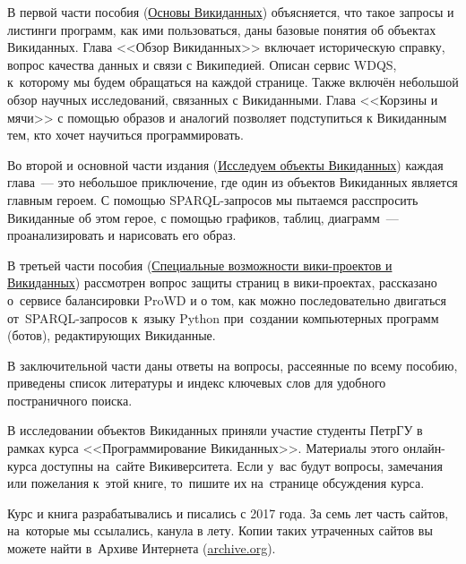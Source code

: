 В первой части пособия (\hyperref[part:foundation]{Основы Викиданных}) объясняется, 
что такое запросы и листинги программ, как ими пользоваться, даны базовые понятия об объектах Викиданных. 
Глава <<Обзор Викиданных>> включает историческую справку, 
вопрос качества данных и связи с Википедией. 
Описан сервис WDQS, к~которому мы будем обращаться на каждой странице. 
Также включён небольшой обзор научных исследований, связанных с Викиданными. 
Глава <<Корзины и мячи>> с помощью образов и аналогий позволяет подступиться к Викиданным тем, 
кто хочет научиться программировать. 


Во второй и основной части издания (\hyperref[part:research]{Исследуем объекты Викиданных}) каждая 
глава~--- это небольшое приключение, 
где один из объектов Викиданных является главным героем. 
С помощью SPARQL-запросов мы пытаемся расспросить Викиданные об этом герое, 
с помощью графиков, таблиц, диаграмм~--- проанализировать и нарисовать его образ. 



\newpage
В третьей части пособия (\hyperref[part:advanced]
                                  {Специальные возможности вики-проектов и Викиданных}) 
рассмотрен вопрос защиты страниц в вики-проектах, 
рассказано о~сервисе балансировки ProWD и о том, 
как можно последовательно двигаться от~SPARQL-запросов 
к~языку Python при~создании компьютерных программ (ботов), редактирующих Викиданные. 


В заключительной части 
даны ответы на вопросы, рассеянные по всему пособию, приведены список литературы 
и индекс ключевых слов для удобного постраничного поиска.

В исследовании объектов Викиданных приняли участие студенты ПетрГУ в рамках курса <<Программирование Викиданных>>. 
Материалы этого онлайн-курса доступны на~сайте Викиверситета. 
Если у~вас будут вопросы, замечания или пожелания к~этой книге, 
то~пишите их на~странице обсуждения курса. 

Курс и книга разрабатывались и писались с 2017 года. 
За семь лет часть сайтов, на~которые мы ссылались, канула в лету. 
Копии таких утраченных сайтов вы можете найти в~Архиве Интернета (\href{https://archive.org/}{archive.org}).

